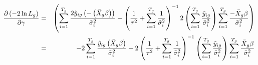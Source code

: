 \documentclass[12pt]{article}
\begin{document}
\begin{eqnarray*}
\frac{\partial \left( -2\ln L_{g}\right) }{\partial \gamma } &=&\left(
\sum_{i=1}^{T_{g}}\frac{2\tilde{y}_{ig}\left( -\left( \bar{X}_{g}\beta
\right) \right) }{\tilde{\sigma}_{i}^{2}}-\left( \frac{1}{\tau ^{2}}%
+\sum_{i=1}^{T_{g}}\frac{1}{\tilde{\sigma}_{i}^{2}}\right) ^{-1}2\left(
\sum_{i=1}^{T_{g}}\frac{\tilde{y}_{ig}}{\tilde{\sigma}_{i}^{2}}\right)
\sum_{i=1}^{T_{g}}\frac{-\bar{X}_{g}\beta }{\tilde{\sigma}_{i}^{2}}\right) \\
&=&-2\sum_{i=1}^{T_{g}}\frac{\tilde{y}_{ig}\left( \bar{X}_{g}\beta \right) }{%
\tilde{\sigma}_{i}^{2}}+2\left( \frac{1}{\tau ^{2}}+\sum_{i=1}^{T_{g}}\frac{1%
}{\tilde{\sigma}_{i}^{2}}\right) ^{-1}\left( \sum_{i=1}^{T_{g}}\frac{\tilde{y%
}_{ig}}{\tilde{\sigma}_{i}^{2}}\right) \sum_{i=1}^{T_{g}}\frac{\bar{X}%
_{g}\beta }{\tilde{\sigma}_{i}^{2}}
\end{eqnarray*}
\end{document}
